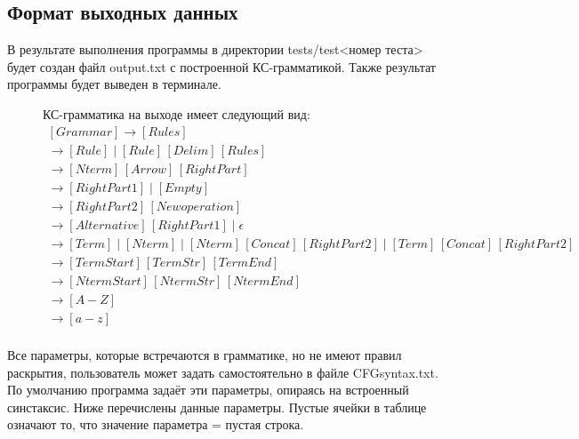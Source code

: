 \documentclass{article}
\begin{document}
\subsection{Формат выходных данных}
В результате выполнения программы в директории tests/test<номер теста> будет создан файл output.txt с построенной КС-грамматикой. Также результат программы будет выведен в терминале.

\begin{figure}[H]
КС-грамматика на выходе имеет следующий вид:
\centering
        $$\begin{array}{l}
        [Grammar] \to [Rules] \\  
        
        [Rules] \to [Rule] \;|\; [Rule]\,[Delim]\,[Rules] \\

        [Rule] \to [Nterm]\,[Arrow]\,[RightPart]  \\ 
        
        [RightPart] \to [RightPart1] \;|\; [Empty]\\ 

        [RightPart1] \to [RightPart2]\,[Newoperation] \\

        [Newoperation] \to [Alternative]\,[RightPart1] \;|\; \epsilon \\
        
        [RightPart2] \to [Term] \;|\; [Nterm] \;|\; [Nterm]\,[Concat]\,[RightPart2] \;|\; [Term]\,[Concat]\,[RightPart2] \\
        
        [Term] \to [TermStart]\,[TermStr]\,[TermEnd] \\
        
        [Nterm] \to [NtermStart]\,[NtermStr]\,[NtermEnd] \\ 
        
        [NtermStr] \to [A-Z] \\
        
        [TermStr] \to [a-z] \\
        \end{array}$$  
\end{figure}
Все параметры, которые встречаются в грамматике, но не имеют правил раскрытия, пользователь может задать самостоятельно в файле CFGsyntax.txt. По умолчанию программа задаёт эти параметры, опираясь на встроенный синстаксис. Ниже перечислены данные параметры. Пустые ячейки в таблице означают то, что значение параметра = пустая строка.
\end{document}
